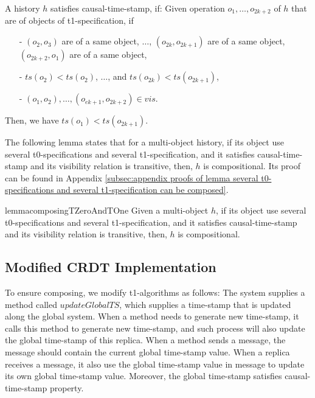 A history $h$ satisfies causal-time-stamp, if: Given operation $o_1,\ldots,o_{\mathit{2k+2}}$ of $h$ that are of objects of t1-specification, if

\begin{itemize}
\setlength{\itemsep}{0.5pt}
\item[-] $(o_2,o_3)$ are of a same object, $\ldots$, $(o_{\mathit{2k}},o_{\mathit{2k+1}})$ are of a same object, $(o_{\mathit{2k+2}},o_1)$ are of a same object,

\item[-] $\mathit{ts}(o_2) < \mathit{ts}(o_2)$, $\ldots$, and $\mathit{ts}(o_{\mathit{2k}}) < \mathit{ts}(o_{\mathit{2k+1}})$,

\item[-] $(o_1,o_2), \ldots, (o_{\mathit{ek+1}},o_{\mathit{2k+2}}) \in \mathit{vis}$.
\end{itemize}

Then, we have $\mathit{ts}(o_1) < \mathit{ts}(o_{\mathit{2k+1}})$.

The following lemma states that for a multi-object history, if its object use several t0-specifications and several t1-specification, and it satisfies causal-time-stamp and its visibility relation is transitive, then, $h$ is compositional. Its proof can be found in Appendix \ref{subsec:appendix proofs of lemma several t0-specifications and several t1-specification can be composed}.

\begin{restatable}{lemma}{composingTZeroAndTOne}
\label{lemma:several t0-specifications and several t1-specification can be composed}
Given a multi-object $h$, if its object use several t0-specifications and several t1-specification, and it satisfies causal-time-stamp and its visibility relation is transitive, then, $h$ is compositional.
\end{restatable}






\subsection{Modified CRDT Implementation}
\label{subsec:modified CRDT implementation} 

To ensure composing, we modify t1-algorithms as follows: The system supplies a method called $\mathit{updateGlobalTS}$, which supplies a time-stamp that is updated along the global system. When a method needs to generate new time-stamp, it calls this method to generate new time-stamp, and such process will also update the global time-stamp of this replica. When a method sends a message, the message should contain the current global time-stamp value. When a replica receives a message, it also use the global time-stamp value in message to update its own global time-stamp value. Moreover, the global time-stamp satisfies causal-time-stamp property.

